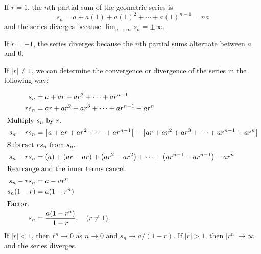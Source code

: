 If $r=1$, the $n$th partial sum of the geometric series is
\[ s_n=a+a(1)+a(1)^2+\cdots+a(1)^{n-1}=na \]
and the series diverges because $\lim_{n \to\infty} s_n = \pm \infty$.

If $r=-1$, the series diverges because the $n$th partial sums alternate between
$a$ and $0$.

If $|r| \neq 1$, we can determine the convergence or divergence of the series in
the following way:

\begin{align*}
  s_n &= a + ar + ar^2 + \cdots + ar^{n-1} \\
  rs_n &= ar + ar^2 + ar^3 + \cdots + ar^{n-1} + ar^n \\ \intertext{Multiply $s_n$ by
  $r$.}
  s_n - rs_n &= \left[ a + ar + ar^2 + \cdots + ar^{n-1} \right]
  -\left[ ar + ar^2 + ar^3 + \cdots + ar^{n-1} + ar^n \right] \\
  \intertext{Subtract $rs_n$ from $s_n$.}
  s_n-rs_n &= \left( a \right)+\left( ar - ar \right)+ \left( ar^2 -
    ar^2   \right) + \cdots + \left( ar^{n-1}-ar^{n-1} \right)-ar^n \\
  \intertext{Rearrange and the inner terms cancel.}
  s_n - rs_n &= a - ar^n \\
  s_n(1-r) &= a(1-r^n) \\ \intertext{Factor.}
  s_n &= \frac{a(1-r^n)}{1-r}, \quad (r \neq 1).
\end{align*}
If $|r| < 1$, then $r^n \to 0$ as $n \to 0$ and $s_n \to a/(1-r)$. If $|r| > 1$,
then $|r^n| \to \infty$ and the series diverges.\cite[p.~546]{thomas}

